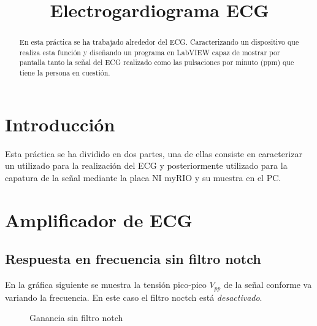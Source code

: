 \documentclass[conference]{IEEEtran}
\begin{document}
\title{Electrogardiograma ECG}

\author{
\and
{}
}

\maketitle

\begin{abstract}
En esta práctica se ha trabajado alrededor del ECG. Caracterizando un dispositivo que realiza esta función y diseñando un programa en LabVIEW capaz de mostrar por pantalla tanto la señal del ECG realizado como las pulsaciones por minuto (ppm) que tiene la persona en cuestión.
\end{abstract}

\section{Introducción}
Esta práctica se ha dividido en dos partes, una de ellas consiste en caracterizar un utilizado para la realización del ECG y posteriormente utilizado para la capatura de la señal mediante la placa NI myRIO y su muestra en el PC.

\section{Amplificador de ECG}
\subsection{Respuesta en frecuencia sin filtro notch}
En la gráfica siguiente se muestra la tensión pico-pico $V_{pp}$ de la señal conforme va variando la frecuencia. En este caso el filtro noctch está \textit{desactivado}. 
\newline

\begin{figure}[htbp]
    \caption{Ganancia sin filtro notch}
    \label{g_sinNotch}
    \end{figure}
\end{document}
